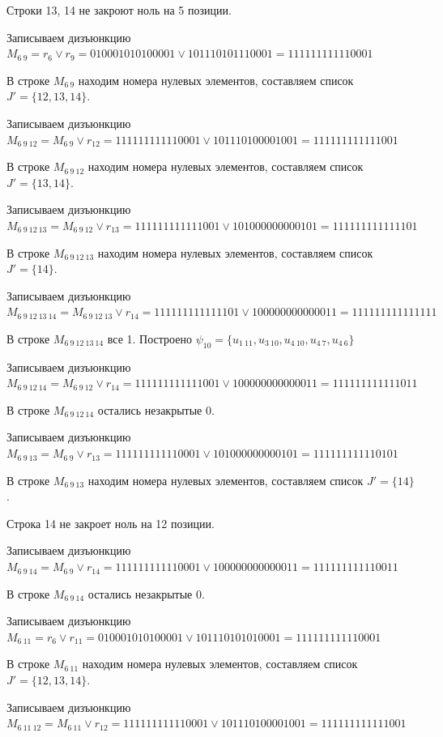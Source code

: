 \documentclass{article}
\begin{document}
Строки 13, 14 не закроют ноль на 5 позиции.

Записываем дизъюнкцию $M_{6\ 9} = r_{6}\lor r_{9} = 010001010100001 \lor 101110101110001 = 111111111110001$

В строке $M_{6\ 9}$ находим номера нулевых элементов, составляем список $J' = \{12, 13, 14\}$.

Записываем дизъюнкцию $M_{6\ 9\ 12} = M_{6\ 9}\lor r_{12} = 111111111110001 \lor 101110100001001 = 111111111111001$

В строке $M_{6\ 9\ 12}$ находим номера нулевых элементов, составляем список $J' = \{13, 14\}$.

Записываем дизъюнкцию $M_{6\ 9\ 12\ 13} = M_{6\ 9\ 12}\lor r_{13} = 111111111111001 \lor 101000000000101 = 111111111111101$

В строке $M_{6\ 9\ 12\ 13}$ находим номера нулевых элементов, составляем список $J' = \{14\}$.

Записываем дизъюнкцию $M_{6\ 9\ 12\ 13\ 14} = M_{6\ 9\ 12\ 13}\lor r_{14} = 111111111111101 \lor 100000000000011 = 111111111111111$

В строке $M_{6\ 9\ 12\ 13\ 14}$ все 1. Построено $\psi_{10} = \{u_{1\ 11},u_{3\ 10},u_{4\ 10},u_{4\ 7},u_{4\ 6}\}$

Записываем дизъюнкцию $M_{6\ 9\ 12\ 14} = M_{6\ 9\ 12}\lor r_{14} = 111111111111001 \lor 100000000000011 = 111111111111011$

В строке $M_{6\ 9\ 12\ 14}$ остались незакрытые 0.

Записываем дизъюнкцию $M_{6\ 9\ 13} = M_{6\ 9}\lor r_{13} = 111111111110001 \lor 101000000000101 = 111111111110101$

В строке $M_{6\ 9\ 13}$ находим номера нулевых элементов, составляем список $J' = \{14\}$.

Строка 14 не закроет ноль на 12 позиции.

Записываем дизъюнкцию $M_{6\ 9\ 14} = M_{6\ 9}\lor r_{14} = 111111111110001 \lor 100000000000011 = 111111111110011$

В строке $M_{6\ 9\ 14}$ остались незакрытые 0.

Записываем дизъюнкцию $M_{6\ 11} = r_{6}\lor r_{11} = 010001010100001 \lor 101110101010001 = 111111111110001$

В строке $M_{6\ 11}$ находим номера нулевых элементов, составляем список $J' = \{12, 13, 14\}$.

Записываем дизъюнкцию $M_{6\ 11\ 12} = M_{6\ 11}\lor r_{12} = 111111111110001 \lor 101110100001001 = 111111111111001$
\end{document}
